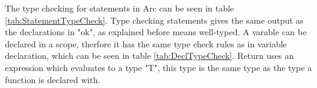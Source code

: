 The type checking for statements in Arc can be seen in table \ref*{tab:StatementTypeCheck}. Type checking statements gives the same output as the declarations in "ok", as explained before means well-typed. A varable can be declared in a scope, therfore it has the same type check rules as in variable declaration, which can be seen in table \ref*{tab:DeclTypeCheck}. Return uses an expression which evaluates to a type "T", this type is the same type as the type a function is declared with. 